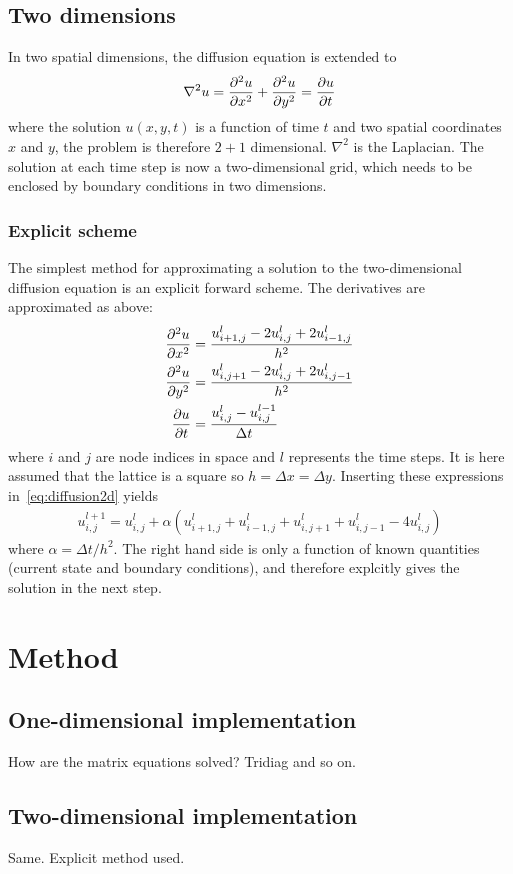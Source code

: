 \documentclass[aps,reprint]{revtex4-1}
\begin{document}
\subsection{Two dimensions}
In two spatial dimensions, the diffusion equation is extended to
\begin{align} \label{eq:diffusion2d}
  \nabla^2 u = \pdv[2]{u}{x} + \pdv[2]{u}{y} = \pdv{u}{t}
\end{align}
where the solution $u(x,y,t)$ is a function of time $t$ and two spatial coordinates $x$ and $y$,
the problem is therefore $2 + 1$ dimensional. $\nabla^2$ is the Laplacian. The solution at
each time step is now a two-dimensional grid, which needs to be enclosed by boundary
conditions in two dimensions.
\subsubsection{Explicit scheme}
The simplest method for approximating a solution to the two-dimensional diffusion
equation is an explicit forward scheme. The derivatives are approximated as above:
\begin{align*}
  \pdv[2]{u}{x} &= \frac{u^l_{i+1,j} - 2u^l_{i,j} + 2u^l_{i-1,j}}{h^2} \\
  \pdv[2]{u}{y} &= \frac{u^l_{i,j+1} - 2u^l_{i,j} + 2u^l_{i,j-1}}{h^2} \\
  \pdv{u}{t} &= \frac{u^l_{i,j} - u^{l-1}_{i,j}}{\Delta{t}}
\end{align*}
where $i$ and $j$ are node indices in space and $l$ represents the time steps. It
is here assumed that the lattice is a square so $h = \Delta{x} = \Delta{y}$. Inserting
these expressions in~\ref{eq:diffusion2d} yields
\begin{align*}
  u_{i,j}^{l+1} = u_{i,j}^l + \alpha (u^l_{i+1,j} + u^l_{i-1,j} + u_{i,j+1}^l + u_{i,j-1}^l - 4 u^l_{i,j})
\end{align*}
where $\alpha = \Delta{t}/h^2$. The right hand side is only a function of known
quantities (current state and boundary conditions), and therefore explcitly gives
the solution in the next step.
\section{Method} \label{sec:method}
\subsection{One-dimensional implementation}
How are the matrix equations solved? Tridiag and so on.
\subsection{Two-dimensional implementation}
Same. Explicit method used.
\end{document}
